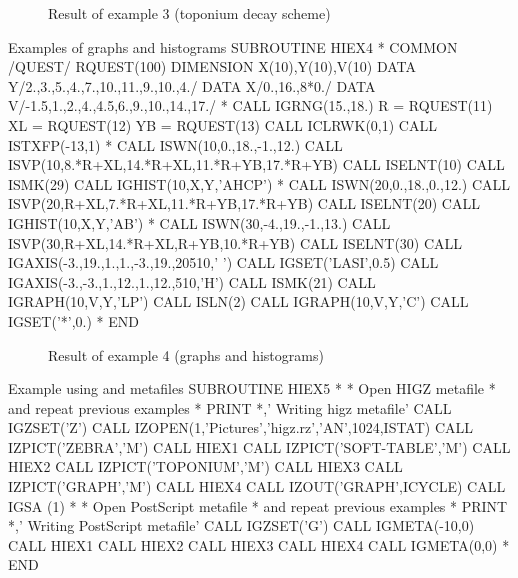 \begin{figure}[p]
\begin{center}\mbox{}\end{center}
\caption{Result of \protect\HIGZ{} example 3 (toponium decay scheme)}
\end{figure}
\clearpage

\begin{XMPt}{Examples of graphs and histograms}
\label{HIEX4}
      SUBROUTINE HIEX4
*
      COMMON /QUEST/ RQUEST(100)
      DIMENSION X(10),Y(10),V(10)
      DATA Y/2.,3.,5.,4.,7.,10.,11.,9.,10.,4./
      DATA X/0.,16.,8*0./
      DATA V/-1.5,1.,2.,4.,4.5,6.,9.,10.,14.,17./
*
      CALL IGRNG(15.,18.)
      R  = RQUEST(11)
      XL = RQUEST(12)
      YB = RQUEST(13)
      CALL ICLRWK(0,1)
      CALL ISTXFP(-13,1)
*
      CALL ISWN(10,0.,18.,-1.,12.)
      CALL ISVP(10,8.*R+XL,14.*R+XL,11.*R+YB,17.*R+YB)
      CALL ISELNT(10)
      CALL ISMK(29)
      CALL IGHIST(10,X,Y,'AHCP')
*
      CALL ISWN(20,0.,18.,0.,12.)
      CALL ISVP(20,R+XL,7.*R+XL,11.*R+YB,17.*R+YB)
      CALL ISELNT(20)
      CALL IGHIST(10,X,Y,'AB')
*
      CALL ISWN(30,-4.,19.,-1.,13.)
      CALL ISVP(30,R+XL,14.*R+XL,R+YB,10.*R+YB)
      CALL ISELNT(30)
      CALL IGAXIS(-3.,19.,1.,1.,-3.,19.,20510,' ')
      CALL IGSET('LASI',0.5)
      CALL IGAXIS(-3.,-3.,1.,12.,1.,12.,510,'H')
      CALL ISMK(21)
      CALL IGRAPH(10,V,Y,'LP')
      CALL ISLN(2)
      CALL IGRAPH(10,V,Y,'C')
      CALL IGSET('*',0.)
*
      END
\end{XMPt}

\begin{figure}[p]
\begin{center}\mbox{}\end{center}
\caption{Result of \protect\HIGZ{} example 4 (graphs and histograms)}
\end{figure}
\clearpage

\begin{XMPt}{Example using \HIGZ{} and \PS{} metafiles}
      SUBROUTINE HIEX5
*
*          Open HIGZ metafile
*          and repeat previous examples
*
      PRINT *,' Writing higz metafile'
      CALL IGZSET('Z')
      CALL IZOPEN(1,'Pictures','higz.rz','AN',1024,ISTAT)
      CALL IZPICT('ZEBRA','M')
      CALL HIEX1
      CALL IZPICT('SOFT-TABLE','M')
      CALL HIEX2
      CALL IZPICT('TOPONIUM','M')
      CALL HIEX3
      CALL IZPICT('GRAPH','M')
      CALL HIEX4
      CALL IZOUT('GRAPH',ICYCLE)
      CALL IGSA (1)
*
*          Open PostScript metafile
*          and repeat previous examples
*
      PRINT *,' Writing PostScript metafile'
      CALL IGZSET('G')
      CALL IGMETA(-10,0)
      CALL HIEX1
      CALL HIEX2
      CALL HIEX3
      CALL HIEX4
      CALL IGMETA(0,0)
*
      END
\end{XMPt}

